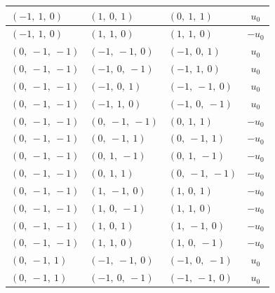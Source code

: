 \documentclass[11pt]{article}
\theoremstyle{definition}
\begin{document}
\begin{longtable}{|l|l|l|c|}
    \hline
    $\left( -1, \  1, \  0\right)$ & $\left( 1, \  0, \  1\right)$ & $\left( 0, \  1, \  1\right)$ & $u_{0}$ \\
    \hline
    $\left( -1, \  1, \  0\right)$ & $\left( 1, \  1, \  0\right)$ & $\left( 1, \  1, \  0\right)$ & $- u_{0}$ \\
    \hline
    $\left( 0, \  -1, \  -1\right)$ & $\left( -1, \  -1, \  0\right)$ & $\left( -1, \  0, \  1\right)$ & $u_{0}$ \\
    \hline
    $\left( 0, \  -1, \  -1\right)$ & $\left( -1, \  0, \  -1\right)$ & $\left( -1, \  1, \  0\right)$ & $u_{0}$ \\
    \hline
    $\left( 0, \  -1, \  -1\right)$ & $\left( -1, \  0, \  1\right)$ & $\left( -1, \  -1, \  0\right)$ & $u_{0}$ \\
    \hline
    $\left( 0, \  -1, \  -1\right)$ & $\left( -1, \  1, \  0\right)$ & $\left( -1, \  0, \  -1\right)$ & $u_{0}$ \\
    \hline
    $\left( 0, \  -1, \  -1\right)$ & $\left( 0, \  -1, \  -1\right)$ & $\left( 0, \  1, \  1\right)$ & $- u_{0}$ \\
    \hline
    $\left( 0, \  -1, \  -1\right)$ & $\left( 0, \  -1, \  1\right)$ & $\left( 0, \  -1, \  1\right)$ & $- u_{0}$ \\
    \hline
    $\left( 0, \  -1, \  -1\right)$ & $\left( 0, \  1, \  -1\right)$ & $\left( 0, \  1, \  -1\right)$ & $- u_{0}$ \\
    \hline
    $\left( 0, \  -1, \  -1\right)$ & $\left( 0, \  1, \  1\right)$ & $\left( 0, \  -1, \  -1\right)$ & $- u_{0}$ \\
    \hline
    $\left( 0, \  -1, \  -1\right)$ & $\left( 1, \  -1, \  0\right)$ & $\left( 1, \  0, \  1\right)$ & $- u_{0}$ \\
    \hline
    $\left( 0, \  -1, \  -1\right)$ & $\left( 1, \  0, \  -1\right)$ & $\left( 1, \  1, \  0\right)$ & $- u_{0}$ \\
    \hline
    $\left( 0, \  -1, \  -1\right)$ & $\left( 1, \  0, \  1\right)$ & $\left( 1, \  -1, \  0\right)$ & $- u_{0}$ \\
    \hline
    $\left( 0, \  -1, \  -1\right)$ & $\left( 1, \  1, \  0\right)$ & $\left( 1, \  0, \  -1\right)$ & $- u_{0}$ \\
    \hline
    $\left( 0, \  -1, \  1\right)$ & $\left( -1, \  -1, \  0\right)$ & $\left( -1, \  0, \  -1\right)$ & $u_{0}$ \\
    \hline
    $\left( 0, \  -1, \  1\right)$ & $\left( -1, \  0, \  -1\right)$ & $\left( -1, \  -1, \  0\right)$ & $u_{0}$ \\

\end{longtable}
\end{document}

